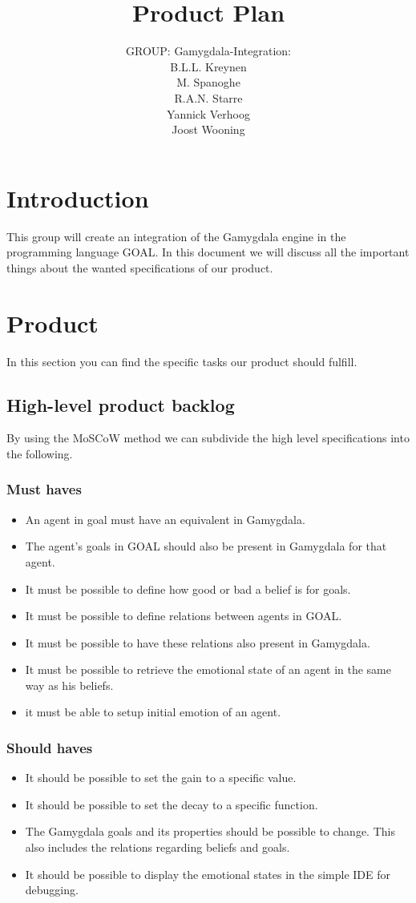 \documentclass[]{article}
\title{Product Plan}
\author{GROUP: Gamygdala-Integration:\\
	B.L.L. Kreynen\\
	M. Spanoghe\\
	R.A.N. Starre\\
	Yannick Verhoog\\
	Joost Wooning\\
	}
\begin{document}
\maketitle
\pagebreak
\tableofcontents
\pagebreak
\section{Introduction}
This group will create an integration of the \gls{Gamygdala} engine in the programming language \gls{GOAL}. In this document we will discuss all the important things about the wanted specifications of our product.
\section{Product}
In this section you can find the specific tasks our product should fulfill.
\subsection{High-level product backlog}
By using the \gls{MoSCoW} method we can subdivide the high level specifications into the following.
\subsubsection*{Must haves}
\begin{itemize}
	\item An \gls{agent} in goal must have an equivalent in Gamygdala.
	\item The agent's goals in GOAL should also be present in Gamygdala for that agent. 
	\item It must be possible to define how good or bad a belief is for goals.
	\item It must be possible to define relations between agents in GOAL.
	\item It must be possible to have these relations also present in Gamygdala.
	\item It must be possible to retrieve the emotional state of an agent in the same way as his beliefs.
	\item it must be able to setup initial emotion of an agent.
\end{itemize}
 
\subsubsection*{Should haves}

\begin{itemize}
	\item It should be possible to set the gain to a specific value.
	\item It should be possible to set the decay to a specific function.
	\item The  Gamygdala goals and its properties should be possible to change. This also includes the relations regarding beliefs and goals.
	\item It should be possible to display the emotional states in the simple IDE for debugging.
\end{itemize}
\end{document}
